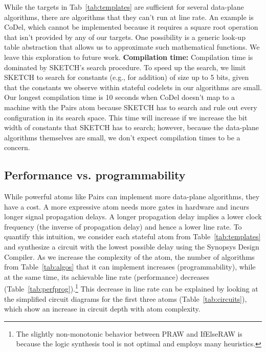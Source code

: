 While the targets in Tab~\ref{tab:templates} are sufficient for several
data-plane algorithms, there are algorithms that they can't run at line rate.
An example is CoDel, which cannot be implemented because it requires a square
root operation that isn't provided by any of our targets. One possibility is a
generic look-up table abstraction that allows us to approximate such
mathematical functions. We leave this exploration to future work.
\textbf{Compilation time:}
Compilation time is dominated by SKETCH's search procedure.  To speed up the
search, we limit SKETCH to search for constants (e.g., for addition) of size up
to 5 bits, given that the constants we observe within stateful codelets in our
algorithms are small. Our longest compilation time is 10 seconds when CoDel
doesn't map to a \absmachine machine with the Pairs atom because SKETCH has to
search and rule out every configuration in its search space.  This time will
increase if we increase the bit width of constants that SKETCH has to search;
however, because the data-plane algorithms themselves are small, we don't
expect compilation times to be a concern.

\subsection{Performance vs. programmability}
\label{ss:perfprog}
While powerful atoms like Pairs can implement more data-plane algorithms, they
have a cost.  A more expressive atom needs more gates in hardware and incurs
longer signal propagation delays. A longer propagation delay implies a lower
clock frequency (the inverse of propagation delay) and hence a lower line rate.
To quantify this intuition, we consider each stateful atom from
Table~\ref{tab:templates} and synthesize a circuit with the lowest possible
delay using the Synopsys Design Compiler. As we increase the complexity of the
atom, the number of algorithms from Table~\ref{tab:algos} that it can implement
increases (programmability), while at the same time, its achievable line rate
(performance) decreases (Table~\ref{tab:perfprog}).\footnote{The slightly
non-monotonic behavior between PRAW and IfElseRAW is because the logic
synthesis tool is not optimal and employs many heuristics.} This decrease in
line rate can be explained by looking at the simplified circuit diagrams for
the first three atoms (Table~\ref{tab:circuits}), which show an increase in
circuit depth with atom complexity.

